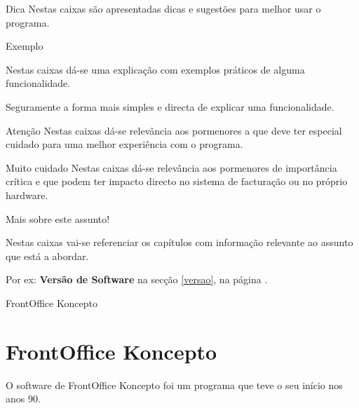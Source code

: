 \documentclass[a4paper,11pt,openany]{memoir}
\newcommand\dica{\texttt{[image: ../small-n-flat-master/png/96/light-bulb.png]}}
\newcommand\exemplo{\texttt{[image: ../small-n-flat-master/png/96/notepad.png]}}
\newcommand\atencao{\texttt{[image: ../small-n-flat-master/png/96/post-it.png]}}
\newcommand\perigo{\texttt{[image: ../small-n-flat-master/png/96/shield-warning.png]}}
\newcommand\relacionados{\texttt{[image: ../small-n-flat-master/png/96/file-link.png]}}
\newcommand{\bcdica}[2]{\vspace{5mm}\begin{bclogo}[couleur=blue!30,logo=\dica]{\hspace{0.7cm}#1}{#2}\end{bclogo}}
\newcommand{\bcexemplo}[2]{\vspace{5mm}\begin{bclogo}[couleur=green!30,logo=\exemplo]{\hspace{0.7cm}#1}{#2}\end{bclogo}}
\newcommand{\bcatencao}[2]{\vspace{5mm}\begin{bclogo}[couleur=yellow!30,logo=\atencao]{\hspace{0.7cm}#1}{#2}\end{bclogo}}
\newcommand{\bcperigo}[2]{\vspace{5mm}\begin{bclogo}[couleur=red!30,logo=\perigo]{\hspace{0.7cm}#1}{#2}\end{bclogo}}
\newcommand{\bcrelacionados}[2]{\vspace{5mm}\begin{bclogo}[logo=\relacionados]{\hspace{0.7cm}Mais sobre este assunto!}{#1}\end{bclogo}}
\begin{document}
\bcdica{Dica}{
Nestas caixas são apresentadas dicas e sugestões para melhor usar o programa. 
}

\bcexemplo{Exemplo}{
Nestas caixas dá-se uma explicação com exemplos práticos de alguma funcionalidade.

Seguramente a forma mais simples e directa de explicar uma funcionalidade.
}


\bcatencao{Atenção}{
Nestas caixas dá-se relevância aos pormenores a que deve ter especial cuidado 
para uma melhor experiência com o programa.
}


\bcperigo{Muito cuidado}{
Nestas caixas dá-se relevância aos pormenores de importância crítica e que podem 
ter impacto directo no sistema de facturação ou no próprio hardware.
}

\bcrelacionados{
Nestas caixas vai-se referenciar os capítulos com informação relevante ao assunto que está a abordar. 
		
Por ex: \textbf{Versão de Software} na secção \ref{versao},  na página \pageref{versao}.
}


% 		
% 
% 



\part{FrontOffice Koncepto}

\chapter{FrontOffice Koncepto}

O software de FrontOffice Koncepto foi um programa que teve o seu início nos anos 90.
\end{document}
